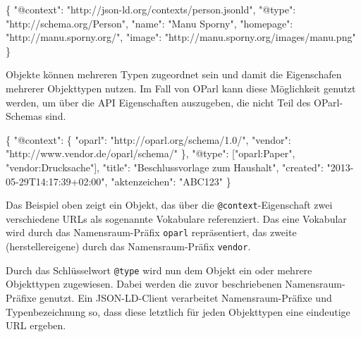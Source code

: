 \documentclass[,a4paper]{article}
\newenvironment{Shaded}{}{}
\newcommand{\DataTypeTok}[1]{\textcolor[rgb]{0.56,0.13,0.00}{{#1}}}
\newcommand{\StringTok}[1]{\textcolor[rgb]{0.25,0.44,0.63}{{#1}}}
\newcommand{\NormalTok}[1]{{#1}}
\begin{document}
\begin{Shaded}
\begin{Highlighting}[]
\NormalTok{\{}
  \DataTypeTok{"@context"}\NormalTok{: }\StringTok{"http://json-ld.org/contexts/person.jsonld"}\NormalTok{,}
  \DataTypeTok{"@type"}\NormalTok{: }\StringTok{"http://schema.org/Person"}\NormalTok{,}
  \DataTypeTok{"name"}\NormalTok{: }\StringTok{"Manu Sporny"}\NormalTok{,}
  \DataTypeTok{"homepage"}\NormalTok{: }\StringTok{"http://manu.sporny.org/"}\NormalTok{,}
  \DataTypeTok{"image"}\NormalTok{: }\StringTok{"http://manu.sporny.org/images/manu.png"}
\NormalTok{\}}
\end{Highlighting}
\end{Shaded}

Objekte können mehreren Typen zugeordnet sein und damit die Eigenschafen
mehrerer Objekttypen nutzen. Im Fall von OParl kann diese Möglichkeit
genutzt werden, um über die API Eigenschaften auszugeben, die nicht Teil
des OParl-Schemas sind.

\begin{Shaded}
\begin{Highlighting}[]
\NormalTok{\{}
  \DataTypeTok{"@context"}\NormalTok{: \{}
    \DataTypeTok{"oparl"}\NormalTok{: }\StringTok{"http://oparl.org/schema/1.0/"}\NormalTok{,}
    \DataTypeTok{"vendor"}\NormalTok{: }\StringTok{"http://www.vendor.de/oparl/schema/"}
  \NormalTok{\},}
  \DataTypeTok{"@type"}\NormalTok{: [}\StringTok{"oparl:Paper"}\NormalTok{, }\StringTok{"vendor:Drucksache"}\NormalTok{],}
  \DataTypeTok{"title"}\NormalTok{: }\StringTok{"Beschlussvorlage zum Haushalt"}\NormalTok{,}
  \DataTypeTok{"created"}\NormalTok{: }\StringTok{"2013-05-29T14:17:39+02:00"}\NormalTok{,}
  \DataTypeTok{"aktenzeichen"}\NormalTok{: }\StringTok{"ABC123"}
\NormalTok{\}}
\end{Highlighting}
\end{Shaded}

Das Beispiel oben zeigt ein Objekt, das über die
\texttt{@context}-Eigenschaft zwei verschiedene URLs als sogenannte
Vokabulare referenziert. Das eine Vokabular wird durch das
Namensraum-Präfix \texttt{oparl} repräsentiert, das zweite
(herstellereigene) durch das Namensraum-Präfix \texttt{vendor}.

Durch das Schlüsselwort \texttt{@type} wird nun dem Objekt ein oder
mehrere Objekttypen zugewiesen. Dabei werden die zuvor beschriebenen
Namensraum-Präfixe genutzt. Ein JSON-LD-Client verarbeitet
Namensraum-Präfixe und Typenbezeichnung so, dass diese letztlich für
jeden Objekttypen eine eindeutige URL ergeben.
\end{document}
